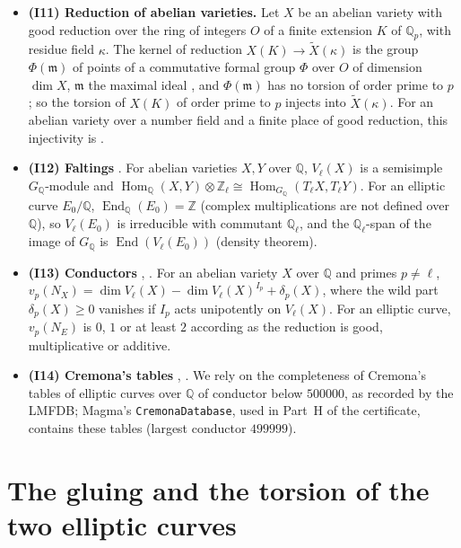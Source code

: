 \documentclass[11pt]{article}
\newcommand{\Q}{\mathbb Q}
\newcommand{\Z}{\mathbb Z}
\DeclareMathOperator{\End}{End}
\DeclareMathOperator{\Hom}{Hom}
\begin{document}
\begin{itemize}
\item \textbf{(I11) Reduction of abelian varieties.} Let \(X\) be an abelian variety with good reduction over the
ring of integers \(O\) of a finite extension \(K\) of \(\Q_p\), with residue field \(\kappa\). The kernel of reduction
\(X(K)\to\widetilde X(\kappa)\) is the group \(\Phi(\mathfrak m)\) of points of a commutative formal group \(\Phi\)
over \(O\) of dimension \(\dim X\), \(\mathfrak m\) the maximal ideal \cite[Theorem~C.2.6]{HS}, and
\(\Phi(\mathfrak m)\) has no torsion of order prime to \(p\) \cite[Proposition~C.2.5]{HS}; so the torsion of
\(X(K)\) of order prime to \(p\) injects into \(\widetilde X(\kappa)\). For an abelian variety over a number field
and a finite place of good reduction, this injectivity is \cite[Theorem~C.1.4]{HS}.

\item \textbf{(I12) Faltings} \cite[\S5, Satz~3, Satz~4 and Korollar~1]{Fal}. For abelian varieties \(X,Y\) over
\(\Q\), \(V_\ell(X)\) is a semisimple \(G_{\Q}\)-module and \(\Hom_{\Q}(X,Y)\otimes\Z_\ell\cong
\Hom_{G_{\Q}}(T_\ell X,T_\ell Y)\). For an elliptic curve \(E_0/\Q\), \(\End_{\Q}(E_0)=\Z\) (complex
multiplications are not defined over \(\Q\)), so \(V_\ell(E_0)\) is irreducible with commutant \(\Q_\ell\), and the
\(\Q_\ell\)-span of the image of \(G_{\Q}\) is \(\End(V_\ell(E_0))\) (density theorem).

\item \textbf{(I13) Conductors} \cite[IV~\S10 and Theorem~IV.10.2]{Si2}, \cite{BK}. For an abelian variety \(X\)
over \(\Q\) and primes \(p\neq\ell\), \(v_p(N_X)=\dim V_\ell(X)-\dim V_\ell(X)^{I_p}+\delta_p(X)\), where the wild
part \(\delta_p(X)\ge0\) vanishes if \(I_p\) acts unipotently on \(V_\ell(X)\). For an elliptic curve,
\(v_p(N_E)\) is \(0\), \(1\) or at least \(2\) according as the reduction is good, multiplicative or additive.

\item \textbf{(I14) Cremona's tables} \cite{Cr}, \cite{LMFDB}. We rely on the completeness of Cremona's tables of
elliptic curves over \(\Q\) of conductor below \(500000\), as recorded by the LMFDB; Magma's
\texttt{CremonaDatabase}, used in Part~H of the certificate, contains these tables (largest conductor \(499999\)).
\end{itemize}

\section{The gluing and the torsion of the two elliptic curves}\label{gluing}
\end{document}
